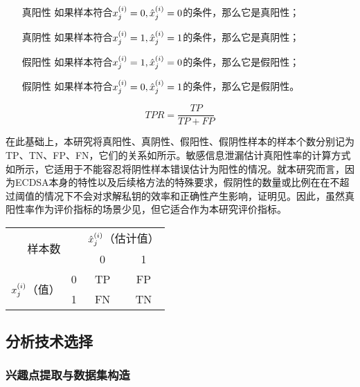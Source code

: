 {	\begin{itemize}
		\item [真阳性] 如果样本符合$x^{(i)}_j=0,\hat {x}^{(i)}_j=0$的条件，那么它是真阳性；
		\item [真阴性] 如果样本符合$x^{(i)}_j=1,\hat {x}^{(i)}_j=1$的条件，那么它是真阴性；
		\item [假阳性] 如果样本符合$x^{(i)}_j=1,\hat {x}^{(i)}_j=0$的条件，那么它是假阳性；
		\item [假阴性] 如果样本符合$x^{(i)}_j=0,\hat {x}^{(i)}_j=1$的条件，那么它是假阴性。
	\end{itemize}

	\begin{equation}\label{eq:tpr}
		TPR=\frac{TP}{TP+FP}
	\end{equation}

	在此基础上，本研究将真阳性、真阴性、假阳性、假阴性样本的样本个数分别记为TP、TN、FP、FN，它们的关系如所示。敏感信息泄漏估计真阳性率的计算方式如所示，它适用于不能容忍将阴性样本错误估计为阳性的情况。就本研究而言，因为ECDSA本身的特性以及后续格方法的特殊要求，假阴性的数量或比例在在不超过阈值的情况下不会对求解私钥的效率和正确性产生影响，证明见。因此，虽然真阳性率作为评价指标的场景少见，但它适合作为本研究评价指标。

	\begin{table}[!h]
		\label{tab:cmatrixk}
		\centering
		\begin{tabular}{c|c|cc}
			\hline
			\multicolumn{2}{c|}{\multirow{2}{*}{样本数}} & \multicolumn{2}{c}{$\hat {x}^{(i)}_j$（估计值）} \\
			\cline{3-4}
			\multicolumn{2}{c|}{}& 0& 1 \\
			\hline
			\multirow{2}{*}{$x^{(i)}_j$（值）} & 0 & TP & FP \\
			& 1 & FN & TN \\
			\hline
		\end{tabular}   
	\end{table}
	
	\subsection{分析技术选择}
	\subsubsection{兴趣点提取与数据集构造}\label{subs:selectpoi}

}
